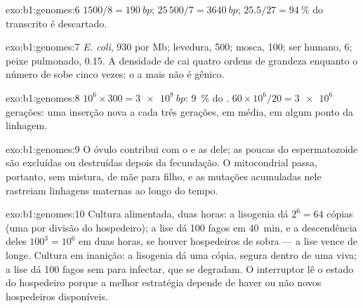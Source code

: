 \begin{solution}{exo:b1:genomes:6}
 $1500/8 = \qty{190}{bp}$;  $25\,500/7 = \qty{3640}{bp}$;
$25.5/27 = \qty{94}{\%}$ do transcrito é descartado.
\end{solution}

\begin{solution}{exo:b1:genomes:7}
\emph{E. coli}, 930  por Mb; levedura, 500; mosca, 100; ser humano,
6; peixe pulmonado, 0.15. A densidade de  cai quatro ordens de
grandeza enquanto o número de  sobe cinco vezes: o  a mais não é
gênico.
\end{solution}

\begin{solution}{exo:b1:genomes:8}
$10^6\times 300 = \qty{3e8}{bp}$: \qty{9}{\%} do . $60\times
10^6/20 = \num{3e6}$ gerações: uma inserção nova a cada três gerações,
em média, em algum ponto da linhagem.
\end{solution}

\begin{solution}{exo:b1:genomes:9}
O óvulo contribui com o  e as  dele; as poucas
 do espermatozoide são excluídas ou destruídas depois da
fecundação. O  mitocondrial passa, portanto, sem mistura, de mãe para
filho, e as mutações acumuladas nele rastreiam linhagens maternas ao
longo do tempo.
\end{solution}

\begin{solution}{exo:b1:genomes:10}
Cultura alimentada, duas horas: a lisogenia dá $2^6 = 64$ cópias (uma
por divisão do hospedeiro); a lise dá 100 fagos em \qty{40}{min}, e a
descendência deles $100^3 = 10^6$ em duas horas, se houver hospedeiros
de sobra --- a lise vence de longe. Cultura em inanição: a lisogenia dá
uma cópia, segura dentro de uma  viva; a lise dá 100 fagos sem
 para infectar, que se degradam. O interruptor lê o estado do
hospedeiro porque a melhor estratégia depende de haver ou não novos
hospedeiros disponíveis.
\end{solution}

